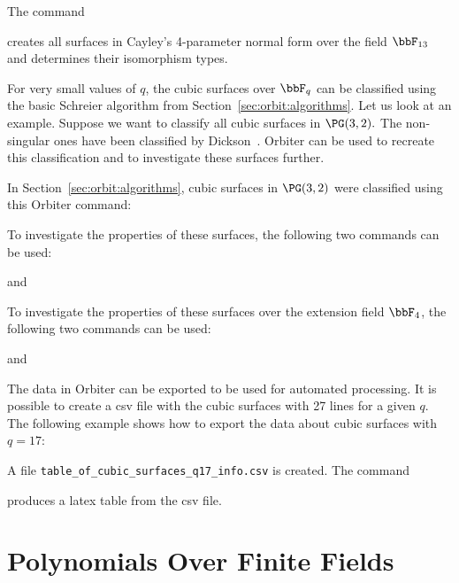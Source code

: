 \bigskip


The command 
{\tt

}
creates all surfaces in Cayley's 4-parameter normal form over the field $\bbF_{13}$ 
and determines their isomorphism types.






For very small values of $q$, the cubic surfaces over $\bbF_q$ can be classified using the 
basic Schreier algorithm from Section~\ref{sec:orbit:algorithms}.
Let us look at an example. 
Suppose we want to classify all cubic surfaces in $\PG(3,2).$ 
The non-singular ones have been classified by 
Dickson~\cite{Dickson15}.
Orbiter can be used to recreate this classification and to investigate these surfaces further.

\bigskip


In Section~\ref{sec:orbit:algorithms},  cubic surfaces in $\PG(3,2)$ 
were classified using this Orbiter command:
{\tt

}
To investigate the properties of these surfaces, 
the following two commands can be used:
{\tt

}
and
{\tt

}
To investigate the properties of these surfaces over the extension field $\bbF_4$, 
the following two commands can be used:
{\tt

}
and
{\tt

}
The data in Orbiter can be exported to be used for automated processing. 
It is possible to create a csv file with the cubic surfaces with 27 lines for a given $q$.
The following example shows how to export the data about cubic surfaces with $q=17$:
{\tt

}
{\tt

}
A file \verb'table_of_cubic_surfaces_q17_info.csv' is created.
The command 
{\tt

}
produces a latex table from the csv file.


\section{Polynomials Over Finite Fields}
\label{sec:polynomials}





\bigskip




